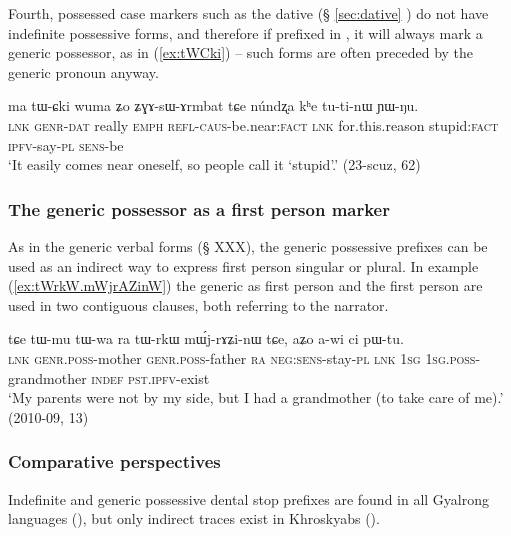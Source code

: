 Fourth, possessed case markers such as the dative  (§ \ref{sec:dative} ) do not have indefinite possessive forms, and therefore if prefixed in , it will always mark a generic possessor, as in (\ref{ex:tWCki}) -- such forms are often preceded by the generic pronoun  anyway.

\begin{exe}
\ex  \label{ex:tWCki}
\gll ma tɯ-ɕki wuma ʑo ʑɣɤ-sɯ-ɤrmbat tɕe núndʐa kʰe tu-ti-nɯ ɲɯ-ŋu. \\
\textsc{lnk} \textsc{genr-dat} really \textsc{emph} \textsc{refl}-\textsc{caus}-be.near:\textsc{fact} \textsc{lnk} for.this.reason stupid:\textsc{fact} \textsc{ipfv}-say-\textsc{pl} \textsc{sens}-be \\
\glt `It easily comes near oneself, so people call it `stupid'.' (23-scuz, 62) 
\end{exe}

\subsubsection{The generic possessor as a first person marker} \label{sec:generic.tW.1sg}
As in the generic verbal forms (§ XXX), the generic possessive prefixes can be used as an indirect way to express first person singular or plural. In example (\ref{ex:tWrkW.mWjrAZinW}) the generic as first person and the first person are used in two contiguous clauses, both referring to the narrator.

\begin{exe}
\ex  \label{ex:tWrkW.mWjrAZinW}
\gll tɕe tɯ-mu tɯ-wa ra tɯ-rkɯ mɯ́j-rɤʑi-nɯ tɕe, aʑo a-wi ci pɯ-tu. \\
\textsc{lnk} \textsc{genr}.\textsc{poss}-mother  \textsc{genr}.\textsc{poss}-father \textsc{ra}  \textsc{neg}:\textsc{sens}-stay-\textsc{pl} \textsc{lnk} \textsc{1sg} \textsc{1sg}.\textsc{poss}-grandmother \textsc{indef} \textsc{pst}.\textsc{ipfv}-exist \\ 
\glt `My parents were not by my side, but I had a grandmother (to take care of me).' (2010-09, 13)
\end{exe}

\subsubsection{Comparative perspectives} \label{sec:indef.t.comparative}
Indefinite and generic possessive dental stop prefixes are found in all Gyalrong languages (\citealt{jackson98morphology}), but only indirect traces exist in Khroskyabs  (\citealt[155]{lai17khroskyabs}). 

